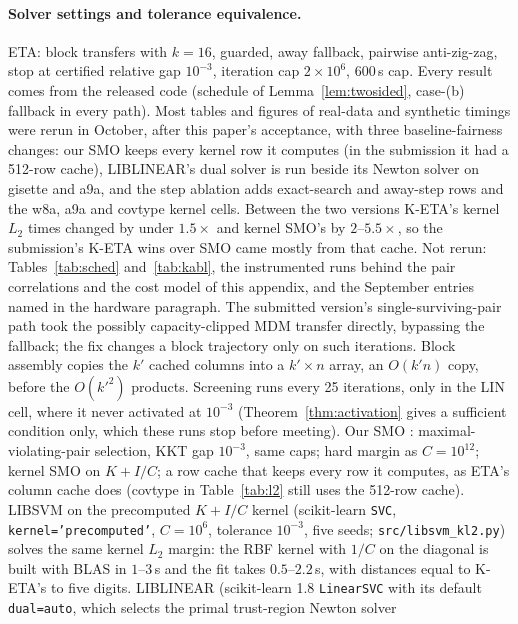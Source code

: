 \documentclass{opt2026}   %
\begin{document}
\paragraph{Solver settings and tolerance equivalence.} ETA: block
transfers with $k=16$, guarded, away fallback, pairwise anti-zig-zag,
stop at certified relative gap $10^{-3}$, iteration cap $2\times10^6$,
600\,s cap. Every result comes from the released code (schedule of
Lemma~\ref{lem:twosided}, case-(b) fallback in every path). Most tables and figures of real-data and synthetic timings were
rerun in October, after this paper's acceptance, with three
baseline-fairness changes: our SMO keeps every kernel row it computes
(in the submission it had a 512-row cache), LIBLINEAR's dual solver is
run beside its Newton solver on gisette and a9a, and the step ablation
adds exact-search and away-step rows and the w8a, a9a and covtype kernel
cells. Between the two versions K-ETA's kernel $L_2$ times changed by
under $1.5\times$ and kernel SMO's by $2$--$5.5\times$, so the
submission's K-ETA wins over SMO came mostly from that cache. Not rerun:
Tables~\ref{tab:sched} and~\ref{tab:kabl}, the instrumented runs behind
the pair correlations and the cost model of this appendix, and the
September entries named in the hardware paragraph. The submitted
version's single-surviving-pair path took the possibly
capacity-clipped MDM transfer directly, bypassing the fallback; the fix
changes a block trajectory only on such iterations. Block assembly copies the $k'$ cached columns into a $k'\times n$
array, an $O(k'n)$ copy, before the $O(k'^2)$ products. Screening runs
every 25 iterations, only in the LIN cell, where it never activated at $10^{-3}$ (Theorem~\ref{thm:activation} gives a
sufficient condition only, which these runs stop before meeting). Our
SMO \cite{platt1998}: maximal-violating-pair selection, KKT gap $10^{-3}$,
same caps; hard margin as $C=10^{12}$; kernel SMO on $K+I/C$; a row
cache that keeps every row it computes, as ETA's column cache does
(covtype in Table~\ref{tab:l2} still uses the 512-row cache). LIBSVM
on the precomputed $K+I/C$ kernel (scikit-learn \texttt{SVC},
\texttt{kernel='precomputed'}, $C{=}10^6$, tolerance $10^{-3}$, five
seeds; \texttt{src/libsvm\_kl2.py}) solves the same kernel $L_2$
margin: the RBF kernel with $1/C$ on the diagonal is built with BLAS in
$1$--$3$\,s and the fit takes $0.5$--$2.2$\,s, with distances equal to
K-ETA's to five digits. LIBLINEAR \cite{fan2008} (scikit-learn
\cite{pedregosa2011} 1.8 \texttt{LinearSVC} with its default
\texttt{dual=\textquotesingle auto\textquotesingle}, which selects the primal trust-region Newton solver
\end{document}
